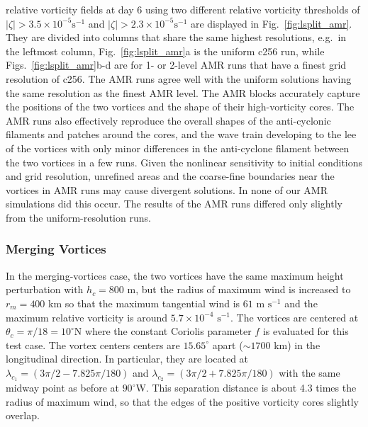 relative vorticity fields at day 6 using two different
relative vorticity thresholds of $|\zeta| > 3.5 \times 10^{-5} \mathrm{ s}^{-1}$
and $|\zeta| > 2.3 \times 10^{-5} \mathrm{ s}^{-1}$ are displayed in
Fig.~\ref{fig:lsplit_amr}.  They are divided into columns that share the same
highest resolutions, e.g.~in the leftmost column, 
Fig.~\ref{fig:lsplit_amr}a is the uniform c256 run, while 
Figs.~\ref{fig:lsplit_amr}b-d are for 1- or 2-level AMR runs that have a
finest grid resolution of c256.  The AMR runs agree well with the
uniform solutions having the same resolution as the finest AMR level.
The AMR blocks accurately capture the positions of the two vortices and
the shape of their high-vorticity cores.  The AMR runs also effectively
reproduce the overall shapes of the anti-cyclonic filaments and patches
around the cores, and the wave train developing to the lee of the
vortices with only minor differences in the anti-cyclone filament
between the two vortices in a few runs.  Given the nonlinear sensitivity
to initial conditions and grid resolution, unrefined areas and the
coarse-fine boundaries near the vortices in AMR runs may cause divergent
solutions.  In none of our AMR simulations did this occur. The results
of the AMR runs differed only slightly from the uniform-resolution runs.

\subsubsection{Merging Vortices}
\label{subsubsec:merging-vortices}

In the merging-vortices case, the two
vortices have the same maximum height perturbation with $h_c =800$ m, but the radius of maximum
wind is increased to $r_m=400$ km so that the maximum tangential wind
is $61 \text{ m s}^{-1}$ and the maximum relative vorticity is around 
$5.7\times 10^{-4}\text{ s}^{-1}$.  The vortices are centered at $\theta_c= \pi/18 = 10^\circ$N  
where the constant Coriolis parameter $f$ is evaluated for this test case. The vortex centers centers are $15.65^\circ$ 
apart ($\sim 1700$ km) in the longitudinal direction. In particular, they are located at 
$\lambda_{c_1} = (3\pi/2 - 7.825\pi/180)$ and $\lambda_{c_2} = (3\pi/2 + 7.825\pi/180)$ with 
the same midway point as before at $90^\circ$W.
This separation distance is about 4.3
times the radius of maximum wind, so that the edges of the positive
vorticity cores slightly overlap.

